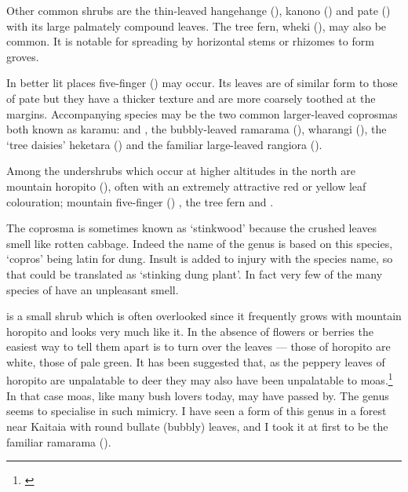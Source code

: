 Other common shrubs are the thin-leaved hangehange (), kanono () and pate () with its large palmately compound leaves.
The tree fern, wheki (), may also be common.
It is notable for spreading by horizontal stems or rhizomes to form groves.

In better lit places five-finger () may occur.
Its leaves are of similar form to those of pate but they have a thicker texture and are more coarsely toothed at the margins.
Accompanying species may be the two common larger-leaved coprosmas both known as karamu:  and , the bubbly-leaved ramarama (), wharangi (), the `tree daisies' heketara () and the familiar large-leaved rangiora ().

Among the undershrubs which occur at higher altitudes in the north are mountain horopito (), often with an extremely attractive red or yellow leaf colouration; mountain five-finger () , the tree fern  and .

The coprosma is sometimes known as `stinkwood' because the crushed leaves smell like rotten cabbage.
Indeed the name of the genus is based on this species, `copros' being latin for dung.
Insult is added to injury with the species name, so that  could be translated as `stinking dung plant'.
In fact very few of the many species of  have an unpleasant smell.

 is a small shrub which is often overlooked since it frequently grows with mountain horopito and looks very much like it.
In the absence of flowers or berries the easiest way to tell them apart is to turn over the leaves — those of horopito are white, those of  pale green.
It has been suggested that, as the peppery leaves of horopito are unpalatable to deer they may also have been unpalatable to moas.\footnote{\cite{greenwood1977evolution}}
In that case moas, like many bush lovers today, may have passed  by.
The genus  seems to specialise in such mimicry.
I have seen a form of this genus in a forest near Kaitaia with round bullate (bubbly) leaves, and I took it at first to be the familiar ramarama ().

